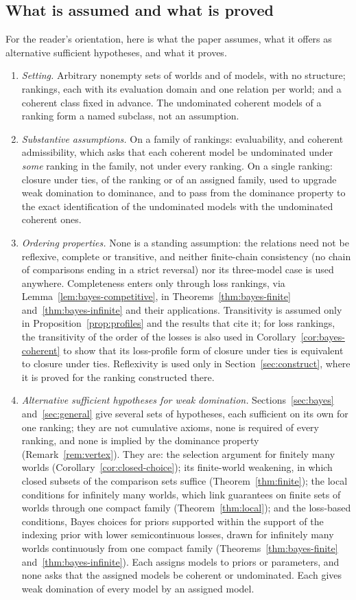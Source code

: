 \documentclass[11pt]{article}
\theoremstyle{definition}
\theoremstyle{remark}
\begin{document}
\subsection{What is assumed and what is proved}\label{sec:inventory}
For the reader's orientation, here is what the paper assumes, what it offers as alternative sufficient hypotheses, and what it proves.
\begin{enumerate}[label=(\arabic*),leftmargin=*]
\item \emph{Setting.} Arbitrary nonempty sets of worlds and of models, with no structure; rankings, each with its evaluation domain and one relation per world; and a coherent class fixed in advance. The undominated coherent models of a ranking form a named subclass, not an assumption.
\item \emph{Substantive assumptions.} On a family of rankings: evaluability, and coherent admissibility, which asks that each coherent model be undominated under \emph{some} ranking in the family, not under every ranking. On a single ranking: closure under ties, of the ranking or of an assigned family, used to upgrade weak domination to dominance, and to pass from the dominance property to the exact identification of the undominated models with the undominated coherent ones.
\item \emph{Ordering properties.} None is a standing assumption: the relations need not be reflexive, complete or transitive, and neither finite-chain consistency (no chain of comparisons ending in a strict reversal) nor its three-model case is used anywhere. Completeness enters only through loss rankings, via Lemma~\ref{lem:bayes-competitive}, in Theorems~\ref{thm:bayes-finite} and~\ref{thm:bayes-infinite} and their applications. Transitivity is assumed only in Proposition~\ref{prop:profiles} and the results that cite it; for loss rankings, the transitivity of the order of the losses is also used in Corollary~\ref{cor:bayes-coherent} to show that its loss-profile form of closure under ties is equivalent to closure under ties. Reflexivity is used only in Section~\ref{sec:construct}, where it is proved for the ranking constructed there.
\item \emph{Alternative sufficient hypotheses for weak domination.} Sections~\ref{sec:bayes} and~\ref{sec:general} give several sets of hypotheses, each sufficient on its own for one ranking; they are not cumulative axioms, none is required of every ranking, and none is implied by the dominance property (Remark~\ref{rem:vertex}). They are: the selection argument for finitely many worlds (Corollary~\ref{cor:closed-choice}); its finite-world weakening, in which closed subsets of the comparison sets suffice (Theorem~\ref{thm:finite}); the local conditions for infinitely many worlds, which link guarantees on finite sets of worlds through one compact family (Theorem~\ref{thm:local}); and the loss-based conditions, Bayes choices for priors supported within the support of the indexing prior with lower semicontinuous losses, drawn for infinitely many worlds continuously from one compact family (Theorems~\ref{thm:bayes-finite} and~\ref{thm:bayes-infinite}). Each assigns models to priors or parameters, and none asks that the assigned models be coherent or undominated. Each gives weak domination of every model by an assigned model.

\end{enumerate}
\end{document}
